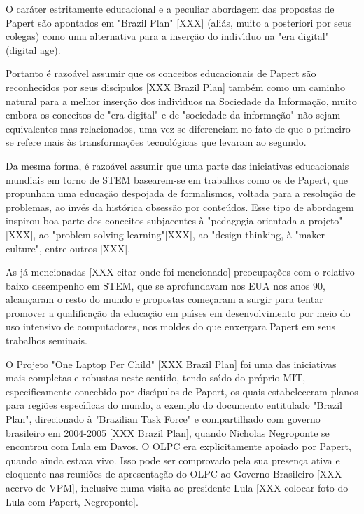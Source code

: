 \documentclass[
12pt,		%
openright,	%
twoside,  %
a4paper,			%
chapter=TITLE,		%
english,			%
french,				%
spanish,			%
brazil				%
]{USPSC-classe/USPSC}
\begin{document}
O car\'ater estritamente educacional e a peculiar abordagem das propostas de Papert s\~ao apontados em "Brazil Plan" [XXX] (ali\'as, muito a posteriori por seus colegas) como uma alternativa para a inser\c{c}\~ao do indiv\'{\i}duo na "era digital" (digital age).


Portanto \'e razo\'avel assumir que os conceitos educacionais de Papert s\~ao reconhecidos por seus disc\'{\i}pulos [XXX Brazil Plan] tamb\'em como um caminho natural para a melhor inser\c{c}\~ao dos indiv\'{\i}duos na Sociedade da Informa\c{c}\~ao, muito embora os conceitos de "era digital" e de "sociedade da informa\c{c}\~ao" n\~ao sejam equivalentes mas relacionados, uma vez se diferenciam no fato de que o primeiro se refere mais \`as transforma\c{c}\~oes tecnol\'ogicas que levaram ao segundo.


Da mesma forma, \'e razo\'avel assumir que uma parte das iniciativas educacionais mundiais em torno de STEM basearem-se em trabalhos como os de Papert, que propunham uma educa\c{c}\~ao despojada de formalismos, voltada para a resolu\c{c}\~ao de problemas, ao inv\'es da hist\'orica obsess\~ao por conte\'udos. Esse tipo de abordagem inspirou boa parte dos conceitos subjacentes \`a "pedagogia orientada a projeto"[XXX], ao "problem solving learning"[XXX], ao "design thinking, \`a "maker culture", entre outros [XXX].


As j\'a mencionadas [XXX citar onde foi mencionado] preocupa\c{c}\~oes com o relativo baixo desempenho em STEM, que se aprofundavam nos EUA nos anos 90, alcan\c{c}aram o resto do mundo e propostas come\c{c}aram a surgir para tentar promover a qualifica\c{c}\~ao da educa\c{c}\~ao em pa\'{\i}ses em desenvolvimento por meio do uso intensivo de computadores, nos moldes do que enxergara Papert em seus trabalhos seminais.


O Projeto "One Laptop Per Child" [XXX Brazil Plan] foi uma das iniciativas mais completas e robustas neste sentido, tendo sa\'{\i}do  do pr\'oprio MIT, especificamente concebido por disc\'{\i}pulos de Papert, os quais estabeleceram planos para regi\~oes espec\'{\i}ficas do mundo, a exemplo do documento entitulado "Brazil Plan", direcionado \`a "Brazilian Task Force" e compartilhado com governo brasileiro em 2004-2005 [XXX Brazil Plan], quando Nicholas Negroponte se encontrou com Lula em Davos. O OLPC era explicitamente apoiado por Papert, quando ainda estava vivo. Isso pode ser comprovado pela sua presen\c{c}a ativa e eloquente nas reuni\~oes de apresenta\c{c}\~ao do OLPC ao Governo Brasileiro [XXX acervo de VPM], inclusive numa visita ao presidente Lula [XXX colocar foto do Lula com Papert, Negroponte].
\end{document}
